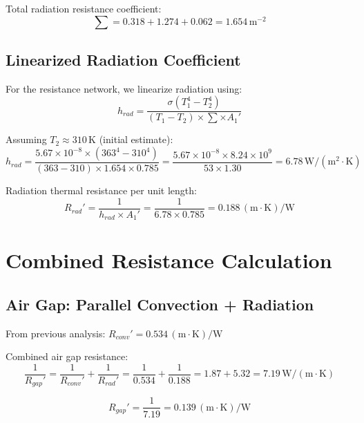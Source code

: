 \documentclass[11pt]{article}
\newcommand{\unit}[1]{\,\mathrm{#1}}
\begin{document}
Total radiation resistance coefficient:
\begin{equation}
    \sum = 0.318 + 1.274 + 0.062 = 1.654\unit{m^{-2}}
\end{equation}

\subsection{Linearized Radiation Coefficient}

For the resistance network, we linearize radiation using:
\begin{equation}
    h_{rad} = \frac{\sigma(T_1^4 - T_2^4)}{(T_1 - T_2) \times \sum \times A_1'}
\end{equation}

Assuming $T_2 \approx 310\unit{K}$ (initial estimate):
\begin{equation}
    h_{rad} = \frac{5.67 \times 10^{-8} \times (363^4 - 310^4)}{(363-310) \times 1.654 \times 0.785} = \frac{5.67 \times 10^{-8} \times 8.24 \times 10^9}{53 \times 1.30} = \boxed{6.78\unit{W/(m^2 \cdot K)}}
\end{equation}

Radiation thermal resistance per unit length:
\begin{equation}
    R_{rad}' = \frac{1}{h_{rad} \times A_1'} = \frac{1}{6.78 \times 0.785} = \boxed{0.188\unit{(m \cdot K)/W}}
\end{equation}

\section{Combined Resistance Calculation}

\subsection{Air Gap: Parallel Convection + Radiation}

From previous analysis: $R_{conv}' = 0.534\unit{(m \cdot K)/W}$

Combined air gap resistance:
\begin{equation}
    \frac{1}{R_{gap}'} = \frac{1}{R_{conv}'} + \frac{1}{R_{rad}'} = \frac{1}{0.534} + \frac{1}{0.188} = 1.87 + 5.32 = 7.19\unit{W/(m \cdot K)}
\end{equation}

\begin{equation}
    R_{gap}' = \frac{1}{7.19} = \boxed{0.139\unit{(m \cdot K)/W}}
\end{equation}
\end{document}
